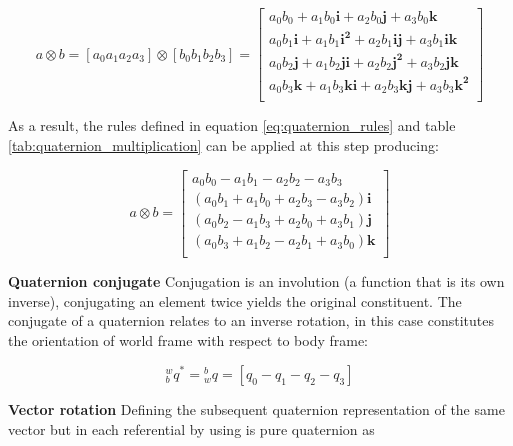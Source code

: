 \begin{equation}
    a \otimes b = \left[a_0 a_1 a_2 a_3\right] \otimes \left[b_0 b_1 b_2 b_3\right]     =
    \begin{bmatrix}
        a_0 b_0 + a_1 b_0\boldsymbol{i} + a_2 b_0\boldsymbol{j} + a_3 b_0\boldsymbol{k}                   \\
        a_0 b_1\boldsymbol{i} + a_1 b_1\boldsymbol{i^2} + a_2 b_1\boldsymbol{ij} + a_3 b_1\boldsymbol{ik} \\
        a_0 b_2\boldsymbol{j}+ a_1 b_2\boldsymbol{ji} + a_2 b_2\boldsymbol{j^2} + a_3 b_2\boldsymbol{jk}  \\
        a_0 b_3\boldsymbol{k} + a_1 b_3\boldsymbol{ki} + a_2 b_3\boldsymbol{kj} + a_3 b_3\boldsymbol{k^2} \\
    \end{bmatrix}
\end{equation}

As a result, the rules defined in equation \ref{eq:quaternion_rules} and table \ref{tab:quaternion_multiplication} can be applied at this step producing:

\begin{equation}
    a \otimes b =
    \begin{bmatrix}
        a_0 b_0 - a_1 b_1 - a_2 b_2 - a_3 b_3                 \\
        (a_0 b_1 + a_1 b_0 + a_2 b_3 - a_3 b_2)\boldsymbol{i} \\
        (a_0 b_2 - a_1 b_3 + a_2 b_0 + a_3 b_1)\boldsymbol{j} \\
        (a_0 b_3 + a_1 b_2 - a_2 b_1 + a_3 b_0)\boldsymbol{k} \\
    \end{bmatrix}
    \label{eq:quaternion_matrix}
\end{equation}

\item \textbf{Quaternion conjugate} Conjugation is an involution (a function that is its own inverse), conjugating an element twice yields the original constituent. The conjugate of a quaternion relates to an inverse rotation, in this case constitutes the orientation of world frame with respect to body frame:

\begin{equation}
    \textrm{$_{b}^{w}q$}^* =\textrm{$_{w}^{b}q$} = \left[q_0 - q_1 - q_2 - q_3\right]
\end{equation}

\item \textbf{Vector rotation} Defining the subsequent quaternion representation of the same vector but in each referential by using is pure quaternion as

